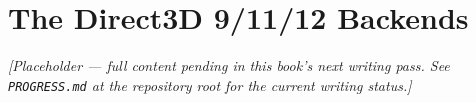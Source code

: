 \chapter{The Direct3D 9/11/12 Backends}
\label{ch:direct3d-backends}

\emph{[Placeholder --- full content pending in this book's next writing pass. See \texttt{PROGRESS.md} at the repository root for the current writing status.]}
